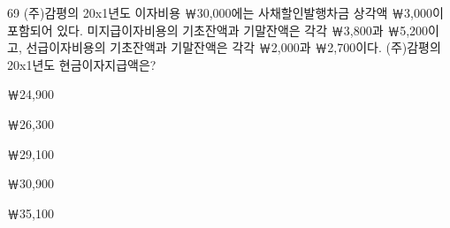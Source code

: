 \begin{question}{69}
(주)감평의 20x1년도 이자비용 ￦30,000에는 사채할인발행차금 상각액 ￦3,000이 포함되어 있다. 미지급이자비용의 기초잔액과 기말잔액은 각각 ￦3,800과 ￦5,200이고, 선급이자비용의 기초잔액과 기말잔액은 각각 ￦2,000과 ￦2,700이다. (주)감평의 20x1년도 현금이자지급액은?
\begin{choices}
  \item ￦24,900
  \item ￦26,300
  \item ￦29,100
  \item ￦30,900
  \item ￦35,100
\end{choices}
\end{question}
